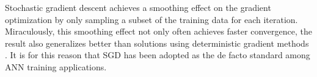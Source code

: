 Stochastic gradient descent achieves a smoothing effect on the gradient optimization by only sampling a subset of the training data for each iteration. Miraculously, this smoothing effect not only often achieves faster convergence, the result also generalizes better than solutions using deterministic gradient methods 
\cite{HardtRS15}. It is for this reason that SGD has been adopted as the de facto standard among ANN training applications.


